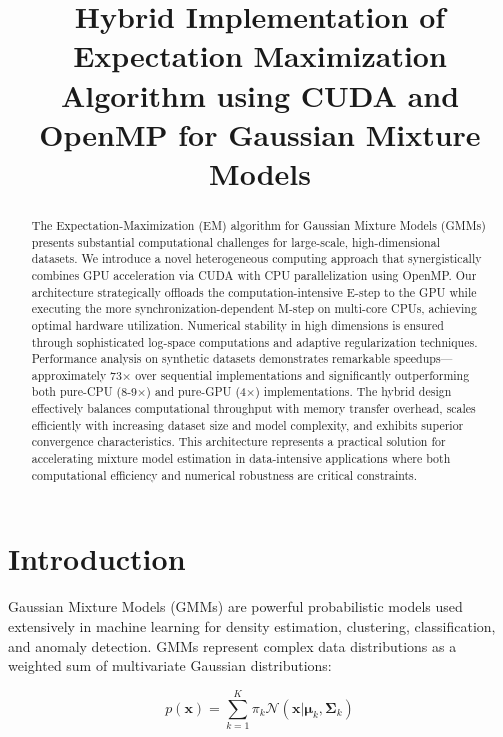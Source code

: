\documentclass[conference]{IEEEtran}
\begin{document}
\title{Hybrid Implementation of Expectation Maximization Algorithm using CUDA and OpenMP for Gaussian Mixture Models}

\author{
}

\maketitle

\begin{abstract}
    The Expectation-Maximization (EM) algorithm for Gaussian Mixture Models (GMMs) presents substantial computational challenges for large-scale, high-dimensional datasets. We introduce a novel heterogeneous computing approach that synergistically combines GPU acceleration via CUDA with CPU parallelization using OpenMP. Our architecture strategically offloads the computation-intensive E-step to the GPU while executing the more synchronization-dependent M-step on multi-core CPUs, achieving optimal hardware utilization. Numerical stability in high dimensions is ensured through sophisticated log-space computations and adaptive regularization techniques. Performance analysis on synthetic datasets demonstrates remarkable speedups—approximately 73× over sequential implementations and significantly outperforming both pure-CPU (8-9×) and pure-GPU (4×) implementations. The hybrid design effectively balances computational throughput with memory transfer overhead, scales efficiently with increasing dataset size and model complexity, and exhibits superior convergence characteristics. This architecture represents a practical solution for accelerating mixture model estimation in data-intensive applications where both computational efficiency and numerical robustness are critical constraints.
\end{abstract}

\section{Introduction}
\label{intro}

Gaussian Mixture Models (GMMs) are powerful probabilistic models used extensively in machine learning for density estimation, clustering, classification, and anomaly detection. GMMs represent complex data distributions as a weighted sum of multivariate Gaussian distributions:

\begin{equation}
p(\mathbf{x}) = \sum_{k=1}^{K} \pi_k \mathcal{N}(\mathbf{x}|\boldsymbol{\mu}_k, \boldsymbol{\Sigma}_k)
\end{equation}
\end{document}

